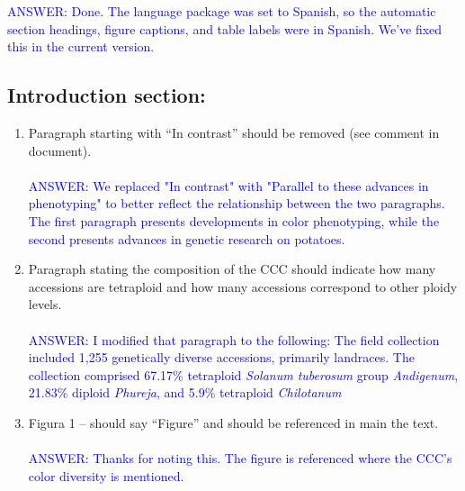 \documentclass{article}
\begin{document}
\textcolor{blue}{ANSWER: Done. The language package was set to Spanish, so the automatic section headings, figure captions, and table labels were in Spanish. We've fixed this in the current version.}
\subsection{ Introduction section:}
\begin{enumerate}
    \item Paragraph starting with “In contrast” should be removed (see comment in document).\\\\
    \textcolor{blue}{ANSWER: We replaced "In contrast" with "Parallel to these advances in phenotyping" to better reflect the relationship between the two paragraphs. The first paragraph presents developments in color phenotyping, while the second presents advances in genetic research on potatoes. }
    \item Paragraph stating the composition of the CCC should indicate how many accessions are tetraploid and how many accessions correspond to other ploidy levels.\\\\
    \textcolor{blue}{ANSWER: I modified that paragraph to the following:}
    \textcolor{blue}{The field collection included 1,255 genetically diverse accessions, primarily landraces. The collection comprised 67.17\% tetraploid \textit{Solanum tuberosum} group \textit{Andigenum}, 21.83\% diploid \textit{Phureja}, and 5.9\% tetraploid \textit{Chilotanum} }
    \item Figura 1 – should say “Figure” and should be referenced in main the text.\\\\
    \textcolor{blue}{ANSWER: Thanks for noting this. The figure is referenced where the CCC's color diversity is mentioned.}
\end{enumerate}
\end{document}
